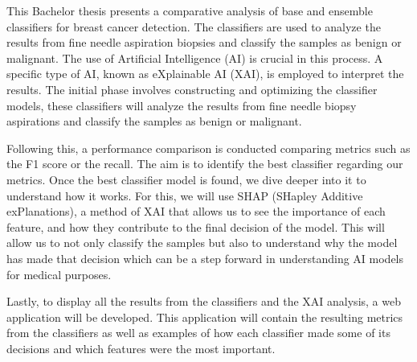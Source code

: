 This Bachelor thesis
presents a comparative analysis of base and ensemble classifiers for breast cancer detection. The classifiers are used to analyze the results from fine needle aspiration biopsies and classify the samples as benign or malignant. The use of Artificial Intelligence (AI) is crucial in this process. A specific type of AI, known as eXplainable AI (XAI), is employed to interpret the results. The initial phase involves constructing and optimizing the classifier models, these classifiers will analyze the results from fine needle biopsy aspirations and classify the samples as benign or malignant.

Following this, a performance comparison is conducted comparing metrics such as the F1 score or the recall. The aim is to identify the best classifier regarding our metrics. Once the best classifier model is found, we dive deeper into it to understand how it works. For this, we will use SHAP (SHapley Additive exPlanations), a method of XAI 
that allows us to see the importance of each feature, and how they contribute to the final decision of the model. This will allow us to not only classify the samples but also to understand why the model has made that decision which can be a step forward in understanding AI models for medical purposes.

Lastly, to display all the results from the classifiers and the XAI analysis, a web application will be developed. This application will contain the resulting metrics from the classifiers as well as examples of how each classifier made some of its decisions and which features were the most important.

